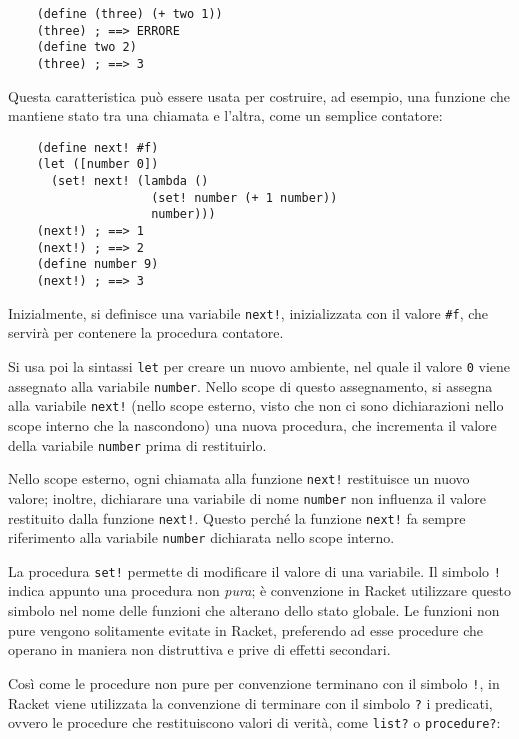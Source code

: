 \begin{lstlisting}
    (define (three) (+ two 1))
    (three) ; ==> ERRORE
    (define two 2)
    (three) ; ==> 3
\end{lstlisting}

Questa caratteristica pu\`o essere usata per costruire, ad esempio, una
funzione che mantiene stato tra una chiamata e l'altra, come un semplice
contatore:

\begin{lstlisting}
    (define next! #f)
    (let ([number 0])
      (set! next! (lambda ()
                    (set! number (+ 1 number))
                    number)))
    (next!) ; ==> 1
    (next!) ; ==> 2
    (define number 9)
    (next!) ; ==> 3
\end{lstlisting}

Inizialmente, si definisce una variabile \lstinline{next!}, inizializzata
con il valore \lstinline{#f}, che servir\`a per contenere la procedura
contatore.

Si usa poi la sintassi \lstinline{let} per creare un nuovo ambiente,
nel quale il valore \lstinline{0} viene assegnato alla variabile
\lstinline{number}. Nello scope di questo assegnamento, si assegna
alla variabile \lstinline{next!} (nello scope esterno, visto che non ci
sono dichiarazioni nello scope interno che la nascondono) una nuova
procedura, che incrementa il valore della variabile \lstinline{number}
prima di restituirlo.

Nello scope esterno, ogni chiamata alla funzione \lstinline{next!}
restituisce un nuovo valore; inoltre, dichiarare una variabile di nome
\lstinline{number} non influenza il valore restituito dalla
funzione \lstinline{next!}. Questo perch\'e la funzione \lstinline{next!}
fa sempre riferimento alla variabile \lstinline{number} dichiarata
nello scope interno.

La procedura \lstinline{set!} permette di modificare il valore di una
variabile. Il simbolo \lstinline{!} indica appunto una procedura non
\emph{pura}; \`e convenzione in Racket utilizzare questo simbolo nel
nome delle funzioni che alterano dello stato globale. Le funzioni non
pure vengono solitamente evitate in Racket, preferendo ad esse procedure
che operano in maniera non distruttiva e prive di effetti secondari.

Cos\`i come le procedure non pure per convenzione terminano con il
simbolo \lstinline{!}, in Racket viene utilizzata la convenzione di
terminare con il simbolo \lstinline{?} i predicati, ovvero le procedure
che restituiscono valori di verit\`a, come \lstinline{list?} o
\lstinline{procedure?}:

